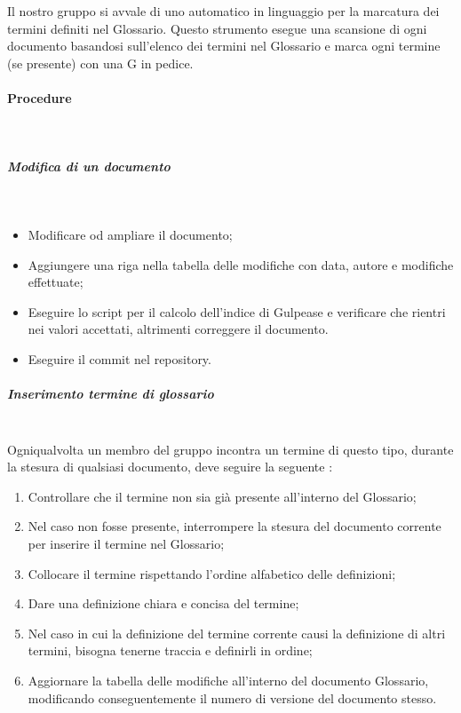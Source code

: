 Il nostro gruppo si avvale di uno  automatico in linguaggio  per la marcatura dei termini definiti nel Glossario. Questo strumento esegue una scansione di ogni documento basandosi sull'elenco dei termini nel Glossario e marca ogni termine (se presente) con una G in pedice.



\paragraph{Procedure} \hfill \\

\subparagraph{Modifica di un documento} \hfill \\
\begin{itemize}
\item Modificare od ampliare il documento;
\item Aggiungere una riga nella tabella delle modifiche con data, autore e modifiche effettuate;
\item Eseguire lo script per il calcolo dell'indice di Gulpease e verificare che rientri nei valori accettati, altrimenti correggere il documento.
\item Eseguire il commit nel repository. 
\end{itemize}

\subparagraph{Inserimento termine di glossario} \hfill \\
Ogniqualvolta un membro del gruppo incontra un termine di questo tipo, durante la stesura di qualsiasi documento, deve seguire la seguente :
\begin{enumerate}
\item Controllare che il termine non sia già presente all'interno del Glossario;
\item Nel caso non fosse presente, interrompere la stesura del documento corrente per inserire il termine nel Glossario;
\item Collocare il termine rispettando l'ordine alfabetico delle definizioni;
\item Dare una definizione chiara e concisa del termine;
\item Nel caso in cui la definizione del termine corrente causi la definizione di altri termini, bisogna tenerne traccia e definirli in ordine;
\item Aggiornare la tabella delle modifiche all'interno del documento Glossario, modificando conseguentemente il numero di versione del documento stesso.
\end{enumerate}

